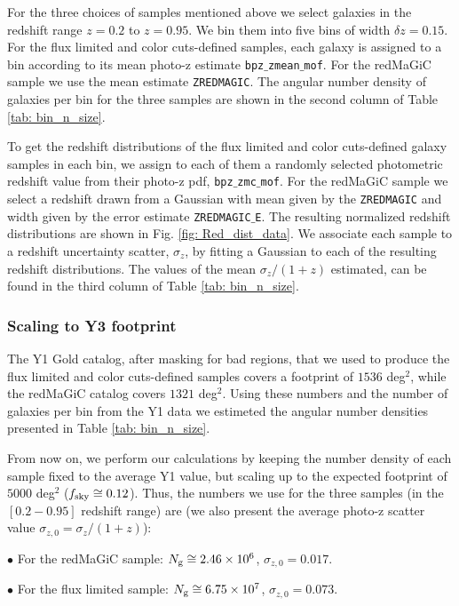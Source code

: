 \documentclass[a4paper,fleqn,usenatbib]{mnras}
\begin{document}
For the three choices of samples mentioned above we select galaxies in the redshift range $z=0.2$ to $z=0.95$. We bin them into five bins of width $\delta z  = 0.15$. For the flux limited and color cuts-defined samples, each galaxy is assigned to a bin according to its mean photo-z estimate \texttt{bpz$\_$zmean$\_$mof}. For the redMaGiC sample we use the mean estimate  \texttt{ZREDMAGIC}. The angular number density of galaxies per bin for the three samples are shown in the second column of Table \ref{tab: bin_n_size}.

To get the redshift distributions of the flux limited and color cuts-defined  galaxy samples in each bin, we assign to each of them a randomly selected photometric redshift value from their photo-z pdf,  \texttt{bpz$\_$zmc$\_$mof}. For the redMaGiC sample we select a redshift drawn from a Gaussian with mean given by the \texttt{ZREDMAGIC} and width given by the error estimate  \texttt{ZREDMAGIC$\_$E}. The resulting normalized redshift distributions are shown in Fig. \ref{fig: Red_dist_data}. We associate each sample to a redshift uncertainty scatter, $\sigma_z$, by fitting a Gaussian to each of the resulting redshift distributions. The values of the mean $\sigma_z/(1+z)$ estimated, can be found in the third column of Table \ref{tab: bin_n_size}.

\subsubsection{Scaling to Y3 footprint}

The Y1 Gold catalog, after masking for bad regions, that we used to produce the flux limited and color cuts-defined samples covers a footprint of $1536$ deg$^2$, while the redMaGiC catalog covers $1321$ deg$^2$. Using these numbers and the number of galaxies per bin from the Y1 data we estimeted the angular number densities presented in Table \ref{tab: bin_n_size}.

From now on, we perform our calculations by keeping the number density of each sample fixed to the average Y1 value, but scaling up to the expected footprint of $5000$ deg$^2$ ($f_{\mbox{\scriptsize{sky}}} \cong 0.12$). Thus, the numbers we use for the three samples (in the $[0.2-0.95]$ redshift range) are (we also present the average photo-z scatter value $\sigma_{z,0} = \sigma_z/(1+z)$):

$\bullet$ For the redMaGiC sample: $N_{\mbox{\scriptsize{g}}} \cong 2.46 \times 10^6$, $\sigma_{z,0} = 0.017$.

$\bullet$ For the flux limited sample: $N_{\mbox{\scriptsize{g}}} \cong 6.75 \times 10^7$, $\sigma_{z,0} = 0.073$.
\end{document}
